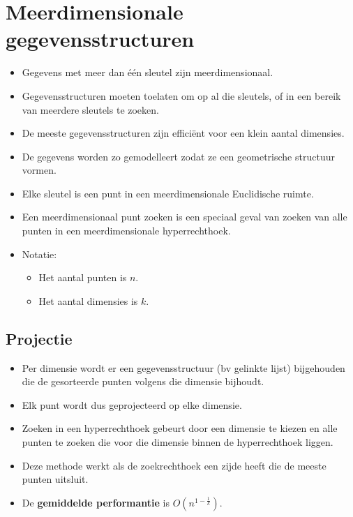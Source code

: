 \chapter{Meerdimensionale gegevensstructuren}
\begin{itemize}
    \item Gegevens met meer dan één sleutel zijn meerdimensionaal.
    \item Gegevensstructuren moeten toelaten om op al die sleutels, of in een bereik van meerdere sleutels te zoeken.
    \item De meeste gegevensstructuren zijn efficiënt voor een klein aantal dimensies.
    \item De gegevens worden zo gemodelleert zodat ze een geometrische structuur vormen.
    \item Elke sleutel is een punt in een meerdimensionale Euclidische ruimte.
    \item Een meerdimensionaal punt zoeken is een speciaal geval van zoeken van alle punten in een meerdimensionale hyperrechthoek.
    \item Notatie:
    \begin{itemize}
        \item Het aantal punten is $n$.
        \item Het aantal dimensies is $k$.
    \end{itemize}
\end{itemize}

\section{Projectie}
\begin{itemize}
    \item Per dimensie wordt er een gegevensstructuur (bv gelinkte lijst) bijgehouden die de gesorteerde punten volgens die dimensie bijhoudt.
    \item Elk punt wordt dus geprojecteerd op elke dimensie.
    \item Zoeken in een hyperrechthoek gebeurt door een dimensie te kiezen en alle punten te zoeken die voor die dimensie binnen de hyperrechthoek liggen.
    \item Deze methode werkt als de zoekrechthoek een zijde heeft die de meeste punten uitsluit.
    \item De \textbf{gemiddelde performantie} is $O(n^{1-\frac{1}{k}})$.
\end{itemize}
